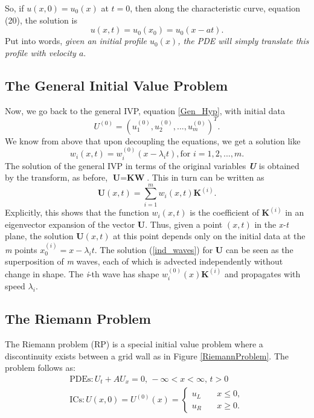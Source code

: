 \documentclass[]{article}
\begin{document}
		So, if $ u(x,0) = u_0(x) $ at $ t = 0 $, then along the characteristic curve, equation (20), the solution is
		\begin{equation}
			u(x,t) = u_0(x_0) = u_0(x-at).
			\label{general_sol}
		\end{equation}
		Put into words, \textit{given an initial profile $ u_0(x) $, the PDE will simply translate this profile with velocity $ a $}.
	
	\subsection{The General Initial Value Problem}
		Now, we go back to the general IVP, equation \ref{Gen_Hyp}, with initial data
		\begin{equation}
			U^{(0)} = (u_1^{(0)}, u_2^{(0)}, ..., u_m^{(0)})^T.
		\end{equation}
		We know from above that upon decoupling the equations, we get a solution like
		\begin{equation}
			w_i(x,t) = w_i^{(0)}(x - \lambda_i t), \mbox{for  } i = 1, 2, ..., m.
		\end{equation}
		The solution of the general IVP in terms of the original variables \textbf{\textit{U}} is obtained by the transform, as before, $ \textbf{U} = \textbf{KW} $. This in turn can be written as 
		\begin{equation}
			\textbf{U}(x,t) = \sum_{i = 1}^{m} w_i(x,t) \textbf{K}^{(i)}.
			\label{ind_waves}
		\end{equation}
		Explicitly, this shows that the function $ w_i(x,t) $ is the coefficient of $ \textbf{K}^{(i)} $ in an eigenvector expansion of the vector \textbf{U}. Thus, given a point $ (x,t) $ in the \textit{x-t} plane, the solution $ \textbf{U}(x,t) $ at this point depends only on the initial data at the \textit{m} points $ x_0^{(i)} = x - \lambda_i t $. The solution (\ref{ind_waves}) for \textbf{U} can be seen as the superposition of \textit{m} waves, each of which is advected independently without change in shape. The \textit{i}-th wave has shape $ w_i^{(0)}(x) \textbf{K}^{(i)} $ and propagates with speed $ \lambda_i $.
	
	\subsection{The Riemann Problem}
		The Riemann problem (RP) is a special initial value problem where a discontinuity exists between a grid wall as in Figure \ref{RiemannProblem}. The problem follows as:
		\begin{equation}
	    	\begin{aligned}
			\mbox{PDEs} : U_t + A U_x = 0\mbox{, } -\infty < x < \infty \mbox{, } t > 0 \\
			\mbox{ICs}: U(x,0) = U^{(0)}(x) = \left\{
			\begin{array}{ll}
			u_L & \quad x \leq 0, \\
			u_R & \quad x \geq 0.
			\end{array}
			\right.
		    \end{aligned}
		\end{equation}
	
\end{document}
